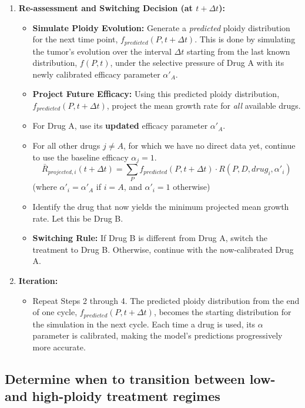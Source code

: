 \documentclass{article}
\begin{document}
\begin{enumerate}
    \item \textbf{Re-assessment and Switching Decision (at $t+\Delta t$):}
    \begin{itemize}
        \item \textbf{Simulate Ploidy Evolution:} \color{blue} Generate a \textit{predicted} ploidy distribution for the next time point, $f_{predicted}(P, t+\Delta t)$. This is done by simulating the tumor's evolution over the interval $\Delta t$ starting from the last known distribution, $f(P, t)$, under the selective pressure of Drug A with its newly calibrated efficacy parameter $\alpha'_A$.
        \item \textbf{Project Future Efficacy:} Using this predicted ploidy distribution, $f_{predicted}(P, t+\Delta t)$, project the mean growth rate for \textit{all} available drugs. \color{black}
        \item For Drug A, use its \textbf{updated} efficacy parameter $\alpha'_A$.
        \item For all other drugs $j \neq A$, for which we have no direct data yet, continue to use the baseline efficacy $\alpha_j=1$.
        $$ \bar{R}_{projected, i}(t+\Delta t) = \sum_{P} f_{predicted}(P, t+\Delta t) \cdot R(P, D, drug_i, \alpha'_i) $$
        (where $\alpha'_i = \alpha'_A$ if $i=A$, and $\alpha'_i = 1$ otherwise)
        \item Identify the drug that now yields the minimum projected mean growth rate. Let this be Drug B.
        \item \textbf{Switching Rule:} If Drug B is different from Drug A, switch the treatment to Drug B. Otherwise, continue with the now-calibrated Drug A.
    \end{itemize}
    
    \item \textbf{Iteration:}
    \begin{itemize}
        \item Repeat Steps 2 through 4. The predicted ploidy distribution from the end of one cycle, $f_{predicted}(P, t+\Delta t)$, becomes the starting distribution for the simulation in the next cycle. Each time a drug is used, its $\alpha$ parameter is calibrated, making the model's predictions progressively more accurate.
    \end{itemize}
\end{enumerate}



\subsection{Determine when to transition between low- and high-ploidy treatment regimes}
\end{document}

